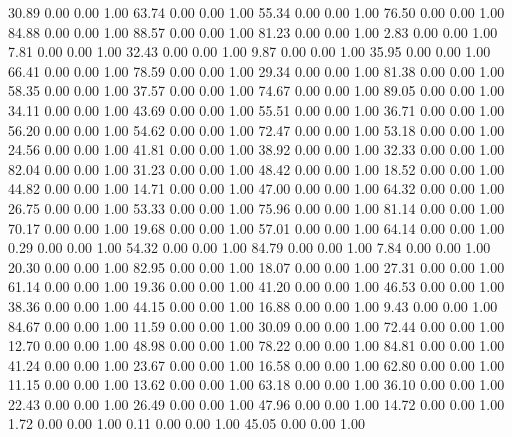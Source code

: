    30.89   0.00   0.00   1.00
   63.74   0.00   0.00   1.00
   55.34   0.00   0.00   1.00
   76.50   0.00   0.00   1.00
   84.88   0.00   0.00   1.00
   88.57   0.00   0.00   1.00
   81.23   0.00   0.00   1.00
    2.83   0.00   0.00   1.00
    7.81   0.00   0.00   1.00
   32.43   0.00   0.00   1.00
    9.87   0.00   0.00   1.00
   35.95   0.00   0.00   1.00
   66.41   0.00   0.00   1.00
   78.59   0.00   0.00   1.00
   29.34   0.00   0.00   1.00
   81.38   0.00   0.00   1.00
   58.35   0.00   0.00   1.00
   37.57   0.00   0.00   1.00
   74.67   0.00   0.00   1.00
   89.05   0.00   0.00   1.00
   34.11   0.00   0.00   1.00
   43.69   0.00   0.00   1.00
   55.51   0.00   0.00   1.00
   36.71   0.00   0.00   1.00
   56.20   0.00   0.00   1.00
   54.62   0.00   0.00   1.00
   72.47   0.00   0.00   1.00
   53.18   0.00   0.00   1.00
   24.56   0.00   0.00   1.00
   41.81   0.00   0.00   1.00
   38.92   0.00   0.00   1.00
   32.33   0.00   0.00   1.00
   82.04   0.00   0.00   1.00
   31.23   0.00   0.00   1.00
   48.42   0.00   0.00   1.00
   18.52   0.00   0.00   1.00
   44.82   0.00   0.00   1.00
   14.71   0.00   0.00   1.00
   47.00   0.00   0.00   1.00
   64.32   0.00   0.00   1.00
   26.75   0.00   0.00   1.00
   53.33   0.00   0.00   1.00
   75.96   0.00   0.00   1.00
   81.14   0.00   0.00   1.00
   70.17   0.00   0.00   1.00
   19.68   0.00   0.00   1.00
   57.01   0.00   0.00   1.00
   64.14   0.00   0.00   1.00
    0.29   0.00   0.00   1.00
   54.32   0.00   0.00   1.00
   84.79   0.00   0.00   1.00
    7.84   0.00   0.00   1.00
   20.30   0.00   0.00   1.00
   82.95   0.00   0.00   1.00
   18.07   0.00   0.00   1.00
   27.31   0.00   0.00   1.00
   61.14   0.00   0.00   1.00
   19.36   0.00   0.00   1.00
   41.20   0.00   0.00   1.00
   46.53   0.00   0.00   1.00
   38.36   0.00   0.00   1.00
   44.15   0.00   0.00   1.00
   16.88   0.00   0.00   1.00
    9.43   0.00   0.00   1.00
   84.67   0.00   0.00   1.00
   11.59   0.00   0.00   1.00
   30.09   0.00   0.00   1.00
   72.44   0.00   0.00   1.00
   12.70   0.00   0.00   1.00
   48.98   0.00   0.00   1.00
   78.22   0.00   0.00   1.00
   84.81   0.00   0.00   1.00
   41.24   0.00   0.00   1.00
   23.67   0.00   0.00   1.00
   16.58   0.00   0.00   1.00
   62.80   0.00   0.00   1.00
   11.15   0.00   0.00   1.00
   13.62   0.00   0.00   1.00
   63.18   0.00   0.00   1.00
   36.10   0.00   0.00   1.00
   22.43   0.00   0.00   1.00
   26.49   0.00   0.00   1.00
   47.96   0.00   0.00   1.00
   14.72   0.00   0.00   1.00
    1.72   0.00   0.00   1.00
    0.11   0.00   0.00   1.00
   45.05   0.00   0.00   1.00
